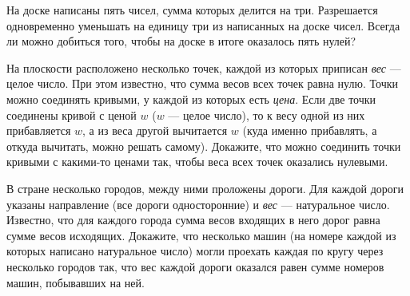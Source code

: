 ﻿
\begin{enumerate}
\itA На доске написаны пять чисел, сумма которых делится на три. Разрешается одновременно уменьшать на единицу три из написанных на доске чисел. Всегда ли можно добиться того, чтобы на доске в итоге оказалось пять нулей?

\itB На плоскости расположено несколько точек, каждой из которых приписан {\itshape вес} — целое число. При этом известно, что сумма весов всех точек равна нулю. Точки можно соединять кривыми, у каждой из которых есть {\itshape цена}. Если две точки соединены кривой с ценой $w$ ($w$ — целое число), то к весу одной из них прибавляется $w$, а из веса другой вычитается $w$ (куда именно прибавлять, а откуда вычитать, можно решать самому). Докажите, что можно соединить точки кривыми с какими-то ценами так, чтобы веса всех точек оказались нулевыми.

\itC В стране несколько городов, между ними проложены дороги. Для каждой дороги указаны направление (все дороги односторонние) и {\itshape вес} — натуральное число. Известно, что для каждого города сумма весов входящих в него дорог равна сумме весов исходящих. Докажите, что несколько машин (на номере каждой из которых написано натуральное число) могли проехать каждая по кругу через несколько городов так, что вес каждой дороги оказался равен сумме номеров машин, побывавших на ней.
\end{enumerate}